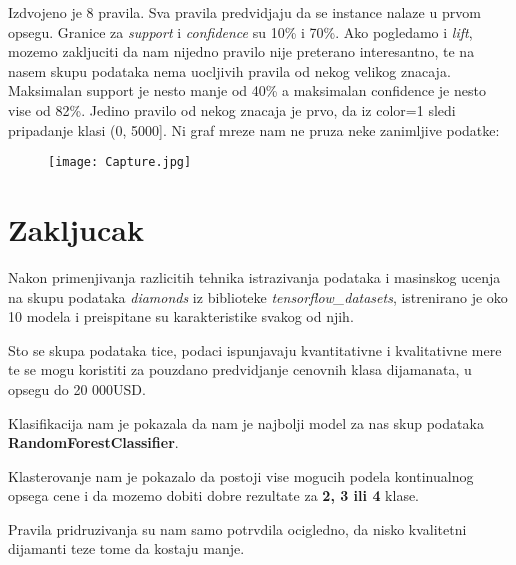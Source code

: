 \documentclass[10pt]{article}
\begin{document}
Izdvojeno je 8 pravila. Sva pravila predvidjaju da se instance nalaze u prvom opsegu. Granice za \textit{support} i \textit{confidence} su 10\% i 70\%. Ako pogledamo i \textit{lift}, mozemo zakljuciti da nam nijedno pravilo nije preterano interesantno, te na nasem skupu podataka nema uocljivih pravila od nekog velikog znacaja. Maksimalan support je nesto manje od 40\% a maksimalan confidence je nesto vise od 82\%. Jedino pravilo od nekog znacaja je prvo, da iz color=1 sledi pripadanje klasi (0, 5000]. Ni graf mreze nam ne pruza neke zanimljive podatke:\pagebreak
\begin{figure}[h]
    \centering
    \texttt{[image: Capture.jpg]}
    \label{Slika17}
\end{figure}

\section{Zakljucak}
Nakon primenjivanja razlicitih tehnika istrazivanja podataka i masinskog ucenja na skupu podataka \textit{diamonds} iz biblioteke \textit{tensorflow\_datasets}, istrenirano je oko 10 modela i preispitane su karakteristike svakog od njih.

Sto se skupa podataka tice, podaci ispunjavaju kvantitativne i kvalitativne mere te se mogu koristiti za pouzdano predvidjanje cenovnih klasa dijamanata, u opsegu do 20 000USD.

Klasifikacija nam je pokazala da nam je najbolji model za nas skup podataka \textbf{RandomForestClassifier}.

Klasterovanje nam je pokazalo da postoji vise mogucih podela kontinualnog opsega cene i da mozemo dobiti dobre rezultate za \textbf{2, 3 ili 4} klase.

Pravila pridruzivanja su nam samo potrvdila ocigledno, da nisko kvalitetni dijamanti teze tome da kostaju manje. 
\end{document}
